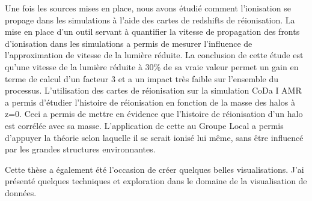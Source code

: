 Une fois les sources mises en place, nous avons étudié comment l'ionisation se propage dans les simulations à l'aide des cartes de redshifts de réionisation.
La mise en place d'un outil servant à quantifier la vitesse de propagation des fronts d'ionisation dans les simulations a permis de mesurer l'influence de l'approximation de vitesse de la lumière réduite.
La conclusion de cette étude est qu'une vitesse de la lumière réduite à 30\% de sa vraie valeur permet un gain en terme de calcul d'un facteur 3 et a un impact très faible sur l'ensemble du processus.
L'utilisation des cartes de réionisation sur la simulation CoDa I AMR a permis d'étudier l'histoire de réionisation en fonction de la masse des halos à z=0.
Ceci a permis de mettre en évidence que l'histoire de réionisation d'un halo est corrélée avec sa masse.%
L'application de cette au Groupe Local a permis d'appuyer la théorie selon  laquelle il se serait ionisé lui même, sans être influencé par les grandes structures environnantes.



Cette thèse a également été l'occasion de créer quelques belles visualisations. %
J'ai présenté quelques techniques et exploration dans le domaine de la visualisation de données.




